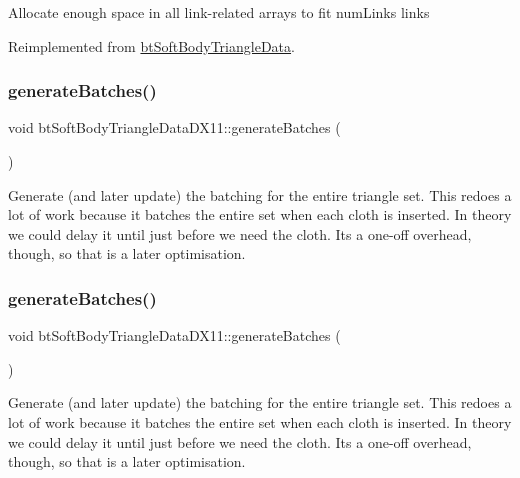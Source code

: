 Allocate enough space in all link-\/related arrays to fit num\+Links links 

Reimplemented from \hyperlink{classbtSoftBodyTriangleData}{bt\+Soft\+Body\+Triangle\+Data}.

\mbox{\label{classbtSoftBodyTriangleDataDX11_af95827e1a6ec034b8fcca098eedc1026}} 
\subsubsection{\texorpdfstring{generate\+Batches()}{generateBatches()}\hspace{0.1cm}{\footnotesize\ttfamily [1/2]}}
{\footnotesize\ttfamily void bt\+Soft\+Body\+Triangle\+Data\+D\+X11\+::generate\+Batches (\begin{DoxyParamCaption}{ }\end{DoxyParamCaption})}

Generate (and later update) the batching for the entire triangle set. This redoes a lot of work because it batches the entire set when each cloth is inserted. In theory we could delay it until just before we need the cloth. It\textquotesingle{}s a one-\/off overhead, though, so that is a later optimisation. \mbox{\label{classbtSoftBodyTriangleDataDX11_af95827e1a6ec034b8fcca098eedc1026}} 
\subsubsection{\texorpdfstring{generate\+Batches()}{generateBatches()}\hspace{0.1cm}{\footnotesize\ttfamily [2/2]}}
{\footnotesize\ttfamily void bt\+Soft\+Body\+Triangle\+Data\+D\+X11\+::generate\+Batches (\begin{DoxyParamCaption}{ }\end{DoxyParamCaption})}

Generate (and later update) the batching for the entire triangle set. This redoes a lot of work because it batches the entire set when each cloth is inserted. In theory we could delay it until just before we need the cloth. It\textquotesingle{}s a one-\/off overhead, though, so that is a later optimisation. \mbox{\label{classbtSoftBodyTriangleDataDX11_aeef8543b31e4ee314e7fdf971197276c}} 
